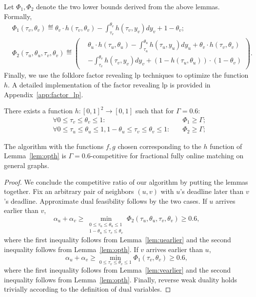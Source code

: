 Let $\Phi_1, \Phi_2$ denote the two lower bounds derived from the above lemmas. Formally,
\begin{align*}
    &\Phi_1(\tau_v,\theta_v) \eqdef \theta_v \cdot h(\tau_v, \theta_v) - \int_{\tau_v}^{\theta_v} h(\tau_v, y_v) dy_v + 1-\theta_v; \\ 
    &\Phi_2(\tau_u,\theta_u,\tau_v,\theta_v) \eqdef \left(
    \begin{aligned}
        &\theta_u \cdot h(\tau_u, \theta_u) - \int_{\tau_u}^{\theta_u} h(\tau_u, y_u) dy_u + \theta_v \cdot h(\tau_v, \theta_v)\\
        & - \int_{\tau_v}^{\theta_v} h(\tau_v, y_v) dy_v + (1-h(\tau_u, \theta_u)) \cdot (1-\theta_v)
    \end{aligned}
    \right).
\end{align*}
Finally, we use the folklore factor revealing lp techniques to optimize the function $h$. A detailed implementation of the factor revealing lp is provided in Appendix~\ref{app:factor_lp}.
\begin{lemma}
\label{lem:opth}
There exists a function $h:[0,1]^2 \to [0,1]$ such that for $\Gamma = 0.6$:
\begin{align}
	& \forall 0\le \tau_v \le \theta_v \le 1: &\Phi_1 \ge \Gamma; \label{eqn:h-feasible-1} \\
    & \forall 0\le \tau_u \le \theta_u \le 1, 1-\theta_u\le \tau_v \le \theta_v \le 1 :\quad  & \Phi_2 \ge \Gamma; \label{eqn:h-feasible-2} 
\end{align}
\end{lemma}

\begin{theorem}
	The algorithm with the functions $f,g$ chosen corresponding to the $h$ function of Lemma~\ref{lem:opth} is $\Gamma=0.6$-competitive for fractional fully online matching on general graphs.
\end{theorem}
\begin{proof}
We conclude the competitive ratio of our algorithm by putting the lemmas together. Fix an arbitrary pair of neighbors $(u,v)$ with $u$'s deadline later than $v$'s deadline. Approximate dual feasibility follows by the two cases. If $u$ arrives earlier than $v$,
\[
\alpha_u + \alpha_v \ge \min_{\substack{0\le\tau_u \le \theta_u\le 1 \\ 1-\theta_u \le \tau_v \le \theta_v}} \Phi_2(\tau_u,\theta_u,\tau_v,\theta_v) \ge 0.6,
\]
where the first inequality follows from Lemma~\ref{lem:uearlier} and the second inequality follows from Lemma~\ref{lem:opth}.
If $v$ arrives earlier than $u$,
\[
\alpha_u + \alpha_v \ge \min_{0\le\tau_v\le\theta_v\le 1} \Phi_1(\tau_v,\theta_v) \ge 0.6,
\]
where the first inequality follows from Lemma~\ref{lem:vearlier} and the second inequality follows from Lemma~\ref{lem:opth}.
Finally, reverse weak duality holds trivially according to the definition of dual variables.
\end{proof}
